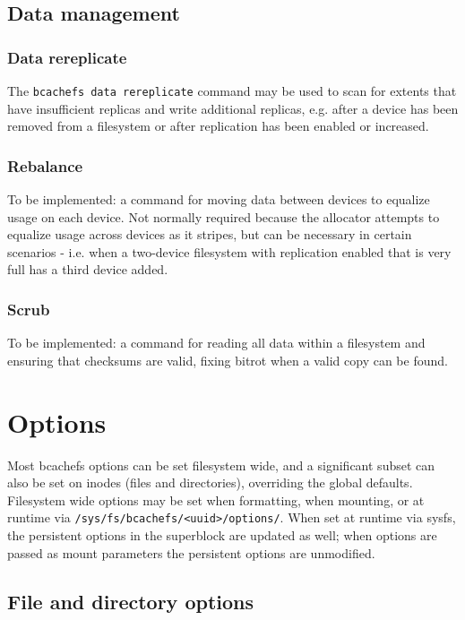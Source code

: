 \documentclass{article}
\begin{document}
\subsection{Data management}

\subsubsection{Data rereplicate}

The \texttt{bcachefs data rereplicate} command may be used to scan for extents
that have insufficient replicas and write additional replicas, e.g. after a
device has been removed from a filesystem or after replication has been enabled
or increased.

\subsubsection{Rebalance}

To be implemented: a command for moving data between devices to equalize usage
on each device. Not normally required because the allocator attempts to equalize
usage across devices as it stripes, but can be necessary in certain scenarios -
i.e. when a two-device filesystem with replication enabled that is very full has
a third device added.

\subsubsection{Scrub}

To be implemented: a command for reading all data within a filesystem and
ensuring that checksums are valid, fixing bitrot when a valid copy can be found.

\section{Options}

Most bcachefs options can be set filesystem wide, and a significant subset can
also be set on inodes (files and directories), overriding the global defaults.
Filesystem wide options may be set when formatting, when mounting, or at runtime
via \texttt{/sys/fs/bcachefs/<uuid>/options/}. When set at runtime via sysfs,
the persistent options in the superblock are updated as well; when options are
passed as mount parameters the persistent options are unmodified.

\subsection{File and directory options}
\end{document}
